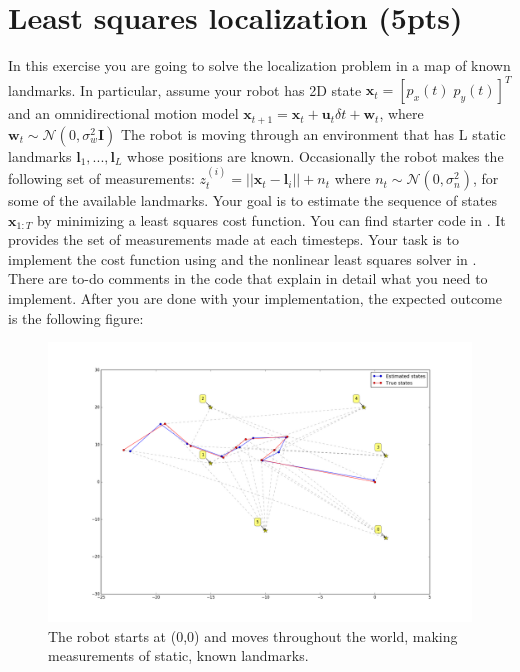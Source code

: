 \documentclass[a4paper,10pt]{article}
\begin{document}
\section{Least squares localization (5pts)}
In this exercise you are going to solve the localization problem in a map of known landmarks. In particular, assume your robot
has 2D state $\textbf{x}_t=[p_x(t) \; p_y(t)]^T$ and an omnidirectional motion model $\textbf{x}_{t+1}=\textbf{x}_t + \textbf{u}_t\delta t + \textbf{w}_t$, where $\textbf{w}_t \sim \mathcal{N}(0, \sigma_w^2\textbf{I})$
The robot is moving through an environment that has L static landmarks $\textbf{l}_1, ..., \textbf{l}_L$ whose positions are known.
Occasionally the robot makes the following set of measurements: $z_t^{(i)}=||\textbf{x}_t-\textbf{l}_i||+n_t$ where $n_t \sim \mathcal{N}(0, \sigma_n^2)$, for some of the available landmarks.
Your goal is to estimate the sequence of states $\textbf{x}_{1:T}$ by minimizing a least squares cost function. 
\newline
\newline
\noindent You can find starter code in . It provides the set of measurements made at each timesteps. Your task is to implement the cost 
function using  and the nonlinear least squares solver in . There are to-do comments in the code that explain in detail what you need to implement. 
After you are done with your implementation, the expected outcome is the following figure:
\begin{figure}[h]
  \begin{center}
    \includegraphics[width=\textwidth]{localization}
  \end{center} 
  \caption{The robot starts at (0,0) and moves throughout the world, making measurements of static, known landmarks.}
\end{figure}
\end{document}
